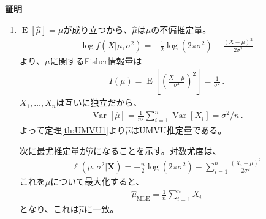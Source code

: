 \documentclass[11pt]{ltjsarticle}
\makeatletter
\theoremstyle{definition}
\DeclareMathOperator{\E}{E}
\DeclareMathOperator{\Var}{Var}
\renewenvironment{proof}[1][証明]{\par
  \pushQED{\qed}%
  \normalfont \topsep6\p@\@plus6\p@\relax
  \trivlist
  \item\relax
  {\bfseries
  #1\@addpunct{.}}\hspace\labelsep\ignorespaces
}{%
  \popQED\endtrivlist\@endpefalse
}
\makeatother
\begin{document}
\begin{proof}
    \begin{enumerate}[(1)]
        \item $\E[\widehat{\mu}]=\mu$が成り立つから、$\widehat{\mu}$は$\mu$の不偏推定量。
        \begin{align}
            \log f(X|\mu,\sigma^2) = -\frac{1}{2}\log(2\pi\sigma^2) - \frac{(X-\mu)^2}{2\sigma^2}
        \end{align}
        より、$\mu$に関するFisher情報量は
        \begin{align}
            I(\mu) = \E\left[\left(\frac{X-\mu}{\sigma^2}\right)^2\right] = \frac{1}{\sigma^2}\, .
        \end{align}
        $X_1,\ldots,X_n$は互いに独立だから、
        \begin{align}
            \Var[\widehat{\mu}] = \frac{1}{n^2}\sum_{i=1}^n\Var[X_i] = \sigma^2/n\, .
        \end{align}
        よって定理\ref{th:UMVU1}より$\widehat{\mu}$はUMVU推定量である。

        次に最尤推定量が$\widehat{\mu}$になることを示す。対数尤度は、
        \begin{align}\label{llnorm}
            \ell(\mu, \sigma^2 | \bm{X}) = -\frac{n}{2}\log(2\pi\sigma^2) - \sum_{i=1}^n\frac{(X_i-\mu)^2}{2\sigma^2}
        \end{align}
        これを$\mu$について最大化すると、
        \begin{align}\label{muMLEnorm}
            \widehat{\mu}_{\text{MLE}} = \frac{1}{n}\sum_{i=1}^n X_i
        \end{align}
        となり、これは$\widehat{\mu}$に一致。


\end{enumerate}
\end{proof}
\end{document}
